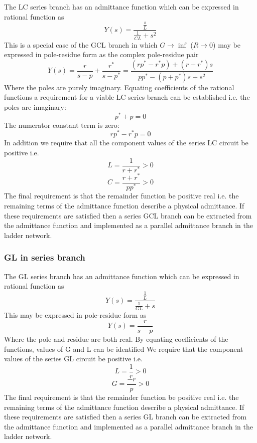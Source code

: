 The LC series branch has an admittance function which can be expressed in rational function as
\begin{equation} 
Y\left(s\right)=\frac{\frac{s}{L}}{\frac{1}{C L} + s^2}
\end{equation}
This is a special case of the GCL branch in which $G \rightarrow \inf$ ($R \rightarrow 0$) may be expressed in pole-residue form as the complex pole-residue pair
\begin{equation} 
Y\left(s\right)= \frac{r}{s-p}+\frac{r^*}{s-p^*}=\frac{\left(rp^*-r^*p\right)+\left( r+r^*\right)s}{pp^*-\left( p+p^*\right)s+s^2}
\end{equation}
Where the poles are purely imaginary. Equating coefficients of the rational functions a requirement for a viable LC series branch can be established i.e. the poles are imaginary:
\begin{equation} 
p^*+p=0
\end{equation}
The numerator constant term is zero:
\begin{equation} 
rp^*-r^*p=0
\end{equation}
In addition we require that all the component values of the series LC circuit be positive i.e.
\begin{equation} 
L=\frac{1}{r+r^*}>0
\end{equation}
\begin{equation} 
C=\frac{r+r^*}{pp^*}>0
\end{equation}
The final requirement is that the remainder function be positive real i.e. the remaining terms of the admittance function describe a physical admittance. If these requirements are satisfied then a series GCL branch can be extracted from the admittance function and implemented as a parallel admittance branch in the ladder network. 

\subsubsection{GL in series branch}

The GL series branch has an admittance function which can be expressed in rational function as
\begin{equation} 
Y\left(s\right)=\frac{\frac{1}{L}}{\frac{1}{G L} + s}
\end{equation}
This may be expressed in pole-residue form as
\begin{equation} 
Y\left(s\right)= \frac{r}{s-p}
\end{equation}
Where the pole and residue are both real. By equating coefficients of the functions, values of G and L can be identified
We require that the component values of the series GL circuit be positive i.e.
\begin{equation} 
L=\frac{1}{r}>0
\end{equation}
\begin{equation} 
G=\frac{-r}{p}>0
\end{equation}
The final requirement is that the remainder function be positive real i.e. the remaining terms of the admittance function describe a physical admittance. If these requirements are satisfied then a series GL branch can be extracted from the admittance function and implemented as a parallel admittance branch in the ladder network. 


